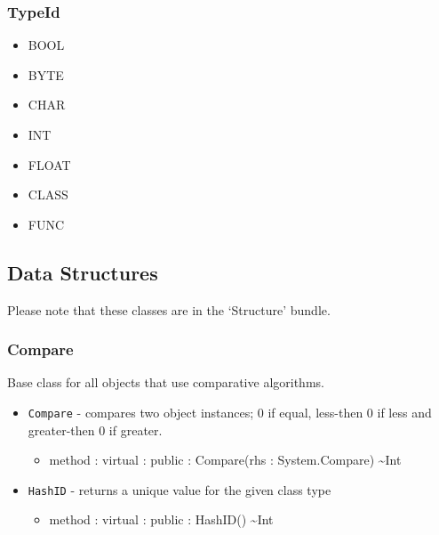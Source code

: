 \documentclass[12pt]{article}
\begin{document}
\subsubsection{TypeId}
 \begin{itemize}
 \item BOOL
 \item BYTE
 \item CHAR
 \item INT
 \item FLOAT
 \item CLASS
 \item FUNC
 \end{itemize}
 
\subsection{Data Structures}
Please note that these classes are in the `Structure' bundle.
\subsubsection{Compare}
Base class for all objects that use comparative algorithms.
\begin{itemize}
\item \texttt{Compare} - compares two object instances; 0 if equal,
  less-then 0 if less and greater-then 0 if greater.
  \begin{itemize}
  \item method : virtual : public : Compare(rhs : System.Compare) \textasciitilde Int
  \end{itemize}
\item \texttt{HashID} - returns a unique value for the given class
  type
  \begin{itemize}
  \item method : virtual : public : HashID() \textasciitilde Int
  \end{itemize}
\end{itemize}
\end{document}
